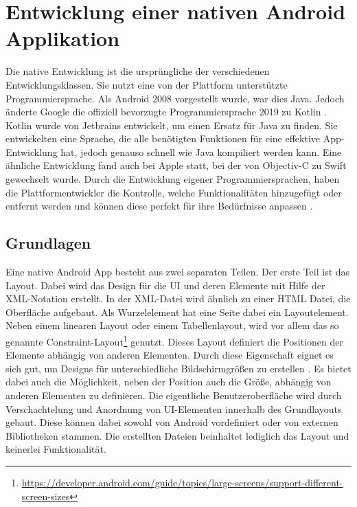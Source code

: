 \section{Entwicklung einer nativen Android Applikation}
Die native Entwicklung ist die ursprüngliche der verschiedenen Entwicklungsklassen. Sie nutzt eine von der Plattform unterstützte Programmiersprache. Als Android 2008 vorgestellt wurde, war dies Java.
Jedoch änderte Google die offiziell bevorzugte Programmiersprache 2019 zu Kotlin \cite{android_standard}. 
Kotlin wurde von Jetbrains entwickelt, um einen Ersatz für Java zu finden. 
Sie entwickelten eine Sprache, die alle benötigten Funktionen für eine effektive App-Entwicklung hat, jedoch genauso schnell wie Java kompiliert werden kann\cite{medium_Swift_Kotlin}. 
Eine ähnliche Entwicklung fand auch bei Apple statt, bei der von Objectiv-C zu Swift gewechselt wurde. 
Durch die Entwicklung eigener Programmiersprachen, haben die Plattformentwickler die Kontrolle, welche Funktionalitäten hinzugefügt oder entfernt werden und können diese perfekt für ihre Bedürfnisse anpassen \cite{medium_Swift_Kotlin}.

\subsection{Grundlagen}
Eine native Android App besteht aus zwei separaten Teilen.
Der erste Teil ist das Layout. Dabei wird das Design für die UI und deren Elemente mit Hilfe der XML-Notation erstellt.
In der XML-Datei wird ähnlich zu einer HTML Datei, die Oberfläche aufgebaut. Als Wurzelelement hat eine Seite dabei ein Layoutelement. Neben einem linearen Layout oder einem Tabellenlayout, wird vor allem das so genannte Constraint-Layout\footnote{\url{https://developer.android.com/guide/topics/large-screens/support-different-screen-sizes}} genutzt. 
Dieses Layout definiert die Positionen der Elemente abhängig von anderen Elementen. Durch diese Eigenschaft eignet es sich gut, um Designs für unterschiedliche Bildschirmgrößen zu erstellen \cite{ConstraintLayout_Android}. Es bietet dabei auch die Möglichkeit, neben der Position auch die Größe, abhängig von anderen Elementen zu definieren.
Die eigentliche Benutzeroberfläche wird durch Verschachtelung und Anordnung von UI-Elementen innerhalb des Grundlayouts gebaut. Diese können dabei sowohl von Android vordefiniert oder von externen Bibliotheken stammen. Die erstellten Dateien beinhaltet lediglich das Layout und keinerlei Funktionalität.

